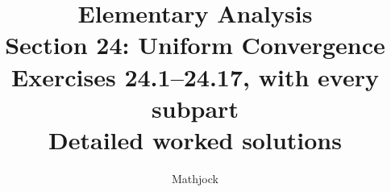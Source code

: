 
\title{\textbf{Elementary Analysis}\\[0.3em]
Section 24: Uniform Convergence\\[0.4em]
\large Exercises 24.1--24.17, with every subpart\\
Detailed worked solutions}
\author{Mathjock}
\date{}

\maketitle
\bookinfo
\tableofcontents
\clearpage
\setcounter{section}{23}


